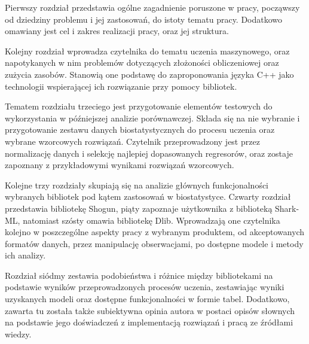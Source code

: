 Pierwszy rozdział przedstawia ogólne zagadnienie poruszone w pracy, począwszy od dziedziny problemu i jej zastosowań, do istoty tematu pracy. Dodatkowo omawiany jest cel i zakres realizacji pracy, oraz jej struktura.

Kolejny rozdział wprowadza czytelnika do tematu uczenia maszynowego, oraz napotykanych w nim problemów dotyczących złożoności obliczeniowej oraz zużycia zasobów. Stanowią one podstawę do zaproponowania języka C++ jako technologii wspierającej ich rozwiązanie przy pomocy bibliotek. 

Tematem rozdziału trzeciego jest przygotowanie elementów testowych do wykorzystania w późniejszej analizie porównawczej. Składa się na nie wybranie i przygotowanie zestawu danych biostatystycznych do procesu uczenia oraz wybrane wzorcowych rozwiązań. Czytelnik przeprowadzony jest przez normalizację danych i selekcję najlepiej dopasowanych regresorów, oraz zostaje zapoznany z przykładowymi wynikami rozwiązań wzorcowych.

Kolejne trzy rozdziały skupiają się na analizie głównych funkcjonalności wybranych bibliotek pod kątem zastosowań w biostatystyce. Czwarty rozdział przedstawia bibliotekę Shogun, piąty zapoznaje użytkownika z biblioteką Shark-ML, natomiast szósty omawia bibliotekę Dlib. Wprowadzają one czytelnika kolejno w poszczególne aspekty pracy z wybranym produktem, od akceptowanych formatów danych, przez manipulację obserwacjami, po dostępne modele i metody ich analizy. 

Rozdział siódmy zestawia podobieństwa i różnice między bibliotekami  na podstawie wyników przeprowadzonych procesów uczenia, zestawiając wyniki uzyskanych modeli oraz dostępne funkcjonalności w formie tabel. Dodatkowo, zawarta tu została także subiektywna opinia autora w postaci opisów słownych na podstawie jego doświadczeń z implementacją rozwiązań i pracą ze źródłami wiedzy.